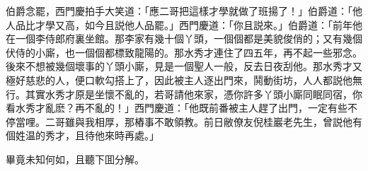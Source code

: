 伯爵念罷，西門慶拍手大笑道：「應二哥把這樣才學就做了班揚了！」伯爵道：「他人品比才學又高，如今且説他人品罷。」西門慶道：「你且説來。」伯爵道：「前年他在一個李侍郎府裏坐館。那李家有幾十個丫頭，一個個都是美貌俊俏的；又有幾個伏侍的小廝，也一個個都標致龍陽的。那水秀才連住了四五年，再不起一些邪念。後來不想被幾個壞事的丫頭小廝，見是一個聖人一般，反去日夜刮他。那水秀才又極好慈悲的人，便口軟勾搭上了，因此被主人逐出門來，鬨動街坊，人人都説他無行。其實水秀才原是坐懷不亂的，若哥請他來家，憑你許多丫頭小廝同眠同宿，你看水秀才亂麽？再不亂的！」西門慶道：「他既前番被主人趕了出門，一定有些不停當哩。二哥雖與我相厚，那樁事不敢領教。前日敝僚友倪桂巖老先生，曾説他有個姓温的秀才，且待他來時再處。」

畢竟未知何如，且聽下囬分解。


